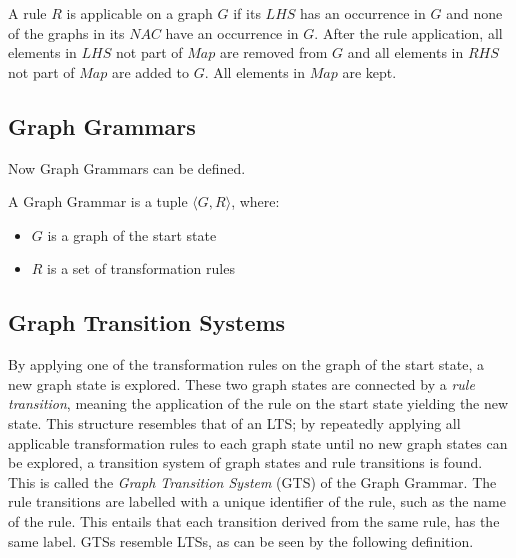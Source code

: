 
A rule $R$ is applicable on a graph $G$ if its $\mathit{LHS}$ has an occurrence in $G$ and none of the graphs in its $\mathit{NAC}$ have an occurrence in $G$. After the rule application, all elements in $\mathit{LHS}$ not part of $\mathit{Map}$ are removed from $G$ and all elements in $\mathit{RHS}$ not part of $\mathit{Map}$ are added to $G$. All elements in $\mathit{Map}$ are kept.


\subsection{Graph Grammars}
Now Graph Grammars can be defined.
\begin{definition}
A Graph Grammar is a tuple $\langle G, R\rangle$, where:
\begin{itemize}
  \item $G$ is a graph of the start state
  \item $R$ is a set of transformation rules
\end{itemize}
\end{definition}

\subsection{Graph Transition Systems}
By applying one of the transformation rules on the graph of the start state, a new graph state is explored. These two graph states are connected by a \textit{rule transition}, meaning the application of the rule on the start state yielding the new state. This structure resembles that of an LTS; by repeatedly applying all applicable transformation rules to each graph state until no new graph states can be explored, a transition system of graph states and rule transitions is found. This is called the \textit{Graph Transition System} (GTS) of the Graph Grammar. The rule transitions are labelled with a unique identifier of the rule, such as the name of the rule. This entails that each transition derived from the same rule, has the same label. GTSs resemble LTSs, as can be seen by the following definition.

